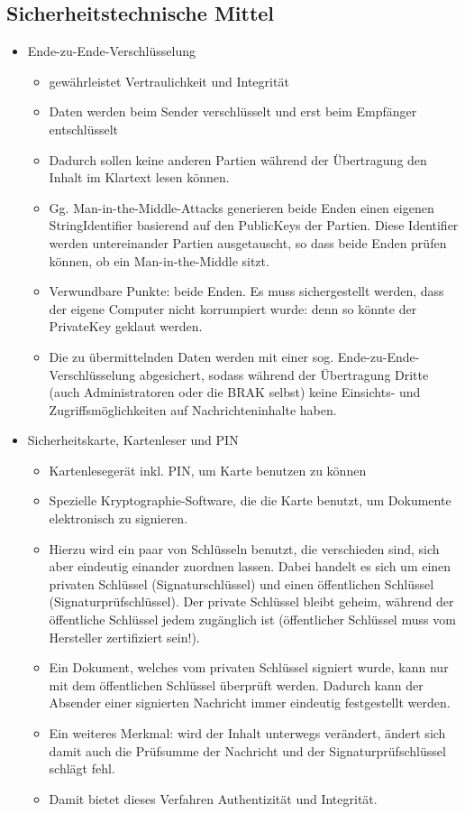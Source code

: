 \subsection{Sicherheitstechnische Mittel}
\begin{itemize}
\item Ende-zu-Ende-Verschlüsselung
\begin{itemize}
\item gewährleistet Vertraulichkeit und Integrität
\item Daten werden beim Sender verschlüsselt und erst beim Empfänger entschlüsselt
\item Dadurch sollen keine anderen Partien während der Übertragung den Inhalt im Klartext lesen können.
\item Gg. Man-in-the-Middle-Attacks generieren beide Enden einen eigenen StringIdentifier basierend auf den PublicKeys der Partien. Diese Identifier werden untereinander Partien ausgetauscht, so dass beide Enden prüfen können, ob ein Man-in-the-Middle sitzt.
\item Verwundbare Punkte: beide Enden. Es muss sichergestellt werden, dass der eigene Computer nicht korrumpiert wurde: denn so könnte der PrivateKey geklaut werden.
\item Die zu übermittelnden Daten werden mit einer sog. Ende-zu-Ende-Verschlüsselung abgesichert, sodass während der Übertragung Dritte (auch Administratoren oder die BRAK selbst) keine Einsichts- und Zugriffsmöglichkeiten auf Nachrichteninhalte haben.
\end{itemize}
\item Sicherheitskarte, Kartenleser und PIN
\begin{itemize}
\item Kartenlesegerät inkl. PIN, um Karte benutzen zu können
\item Spezielle Kryptographie-Software, die die Karte benutzt, um Dokumente elektronisch zu signieren.
\item Hierzu wird ein paar von Schlüsseln benutzt, die verschieden sind, sich aber eindeutig einander zuordnen lassen. Dabei handelt es sich um einen privaten Schlüssel (Signaturschlüssel) und einen öffentlichen Schlüssel (Signaturprüfschlüssel). Der private Schlüssel bleibt geheim, während der öffentliche Schlüssel jedem zugänglich ist (öffentlicher Schlüssel muss vom Hersteller zertifiziert sein!).
\item Ein Dokument, welches vom privaten Schlüssel signiert wurde, kann nur mit dem öffentlichen Schlüssel überprüft werden. Dadurch kann der Absender einer signierten Nachricht immer eindeutig festgestellt werden.
\item Ein weiteres Merkmal: wird der Inhalt unterwegs verändert, ändert sich damit auch die Prüfsumme der Nachricht und der Signaturprüfschlüssel schlägt fehl.
\item Damit bietet dieses Verfahren Authentizität und Integrität.
\end{itemize}
\end{itemize}

